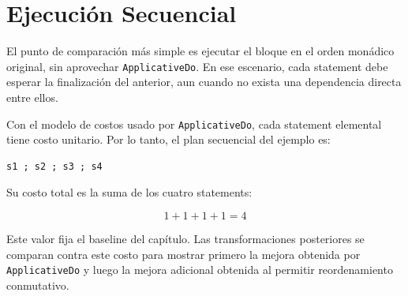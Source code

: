 
\section{Ejecución Secuencial}

El punto de comparación más simple es ejecutar el bloque en el orden monádico original, sin aprovechar \texttt{ApplicativeDo}. En ese escenario, cada statement debe esperar la finalización del anterior, aun cuando no exista una dependencia directa entre ellos.

Con el modelo de costos usado por \texttt{ApplicativeDo}, cada statement elemental tiene costo unitario. Por lo tanto, el plan secuencial del ejemplo es:

\begin{verbatim}
s1 ; s2 ; s3 ; s4
\end{verbatim}

Su costo total es la suma de los cuatro statements:

\[
1 + 1 + 1 + 1 = 4
\]

Este valor fija el baseline del capítulo. Las transformaciones posteriores se comparan contra este costo para mostrar primero la mejora obtenida por \texttt{ApplicativeDo} y luego la mejora adicional obtenida al permitir reordenamiento conmutativo.
